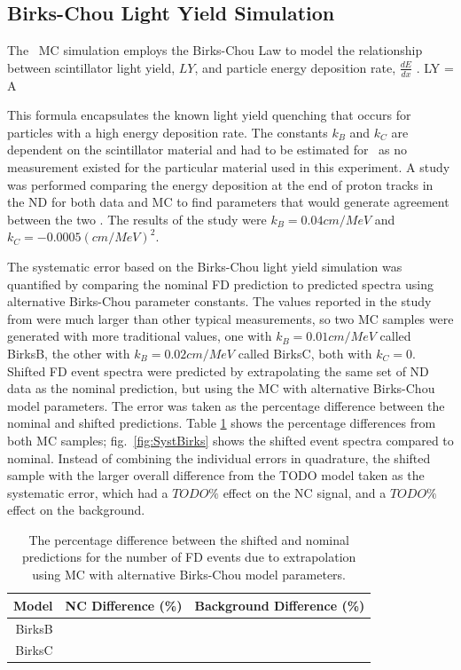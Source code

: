 \subsection{Birks-Chou Light Yield Simulation}

The \nova~MC simulation employs the Birks-Chou Law to model the relationship between scintillator light yield, $LY$, and particle energy deposition rate, $\frac{dE}{dx}$ \cite{ref:BirksChou}. 
\beq
LY = A  
\label{eq:BirksChou}
\eeq

\n This formula encapsulates the known light yield quenching that occurs for particles with a high energy deposition rate. The constants $k_B$ and $k_C$ are dependent on the scintillator material and had to be estimated for \nova~as no measurement existed for the particular material used in this experiment. A study was performed comparing the energy deposition at the end of proton tracks in the ND for both data and MC to find parameters that would generate agreement between the two \cite{ref:DanBirks}. The results of the study were $k_B = 0.04\unit{cm/MeV}$ and $k_C = -0.0005\unit{(cm/MeV)}^2$.

The systematic error based on the Birks-Chou light yield simulation was quantified by comparing the nominal FD prediction to predicted spectra using alternative Birks-Chou parameter constants. The values reported in the study from \cite{ref:DanBirks} were much larger than other typical measurements, so two MC samples were generated with more traditional values, one with $k_B = 0.01\unit{cm/MeV}$ called BirksB, the other with $k_B = 0.02\unit{cm/MeV}$ called BirksC, both with $k_C = 0$. Shifted FD event spectra were predicted by extrapolating the same set of ND data as the nominal prediction, but using the MC with alternative Birks-Chou model parameters. The error was taken as the percentage difference between the nominal and shifted predictions. Table \ref{tab:SystBirks} shows the percentage differences from both MC samples; fig.~\ref{fig:SystBirks} shows the shifted event spectra compared to nominal. Instead of combining the individual errors in quadrature, the shifted sample with the larger overall difference from the TODO model taken as the systematic error, which had a $TODO\%$ effect on the NC signal, and a $TODO\%$ effect on the background.
\begin{table}[h]
  \begin{center}
    \caption[Birks-Chou Systematic Errors]{The percentage difference between the shifted and nominal predictions for the number of FD events due to extrapolation using MC with alternative Birks-Chou model parameters.}
    \label{tab:SystBirks}
    \begin{tabular}{r c c}
      \hline\hline
      Model & NC Difference (\%) & Background Difference (\%) \\
      \hline
      BirksB & & \\
      BirksC & & \\
      \hline
    \end{tabular}
  \end{center}
\end{table}

